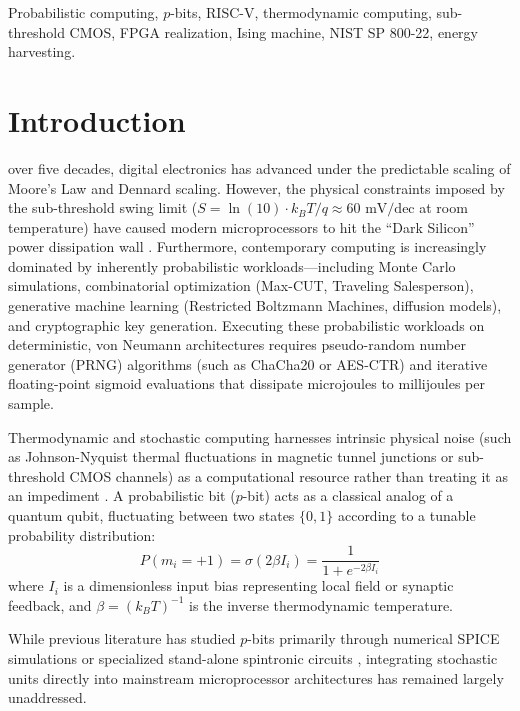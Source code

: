 \documentclass[journal,10pt,twocolumn]{IEEEtran}
\begin{document}
\begin{IEEEkeywords}
Probabilistic computing, $p$-bits, RISC-V, thermodynamic computing, sub-threshold CMOS, FPGA realization, Ising machine, NIST SP 800-22, energy harvesting.
\end{IEEEkeywords}

\section{Introduction}
 over five decades, digital electronics has advanced under the predictable scaling of Moore's Law and Dennard scaling. However, the physical constraints imposed by the sub-threshold swing limit ($S = \ln(10) \cdot k_B T / q \approx 60\text{ mV/dec}$ at room temperature) have caused modern microprocessors to hit the ``Dark Silicon'' power dissipation wall \cite{swanson1972fundamental, landauer1961dissipation}. Furthermore, contemporary computing is increasingly dominated by inherently probabilistic workloads---including Monte Carlo simulations, combinatorial optimization (Max-CUT, Traveling Salesperson), generative machine learning (Restricted Boltzmann Machines, diffusion models), and cryptographic key generation. Executing these probabilistic workloads on deterministic, von Neumann architectures requires pseudo-random number generator (PRNG) algorithms (such as ChaCha20 or AES-CTR) and iterative floating-point sigmoid evaluations that dissipate microjoules to millijoules per sample.

Thermodynamic and stochastic computing harnesses intrinsic physical noise (such as Johnson-Nyquist thermal fluctuations in magnetic tunnel junctions or sub-threshold CMOS channels) as a computational resource rather than treating it as an impediment \cite{camsari2017pbit, camsari2019ising, borders2019integer}. A probabilistic bit ($p$-bit) acts as a classical analog of a quantum qubit, fluctuating between two states $\{0, 1\}$ according to a tunable probability distribution:
\begin{equation}
P(m_i = +1) = \sigma(2\beta I_i) = \frac{1}{1 + e^{-2\beta I_i}}
\label{eq:boltzmann_prob}
\end{equation}
where $I_i$ is a dimensionless input bias representing local field or synaptic feedback, and $\beta = (k_B T)^{-1}$ is the inverse thermodynamic temperature.

While previous literature has studied $p$-bits primarily through numerical SPICE simulations or specialized stand-alone spintronic circuits \cite{kaiser2022hardware}, integrating stochastic units directly into mainstream microprocessor architectures has remained largely unaddressed. 
\end{document}
